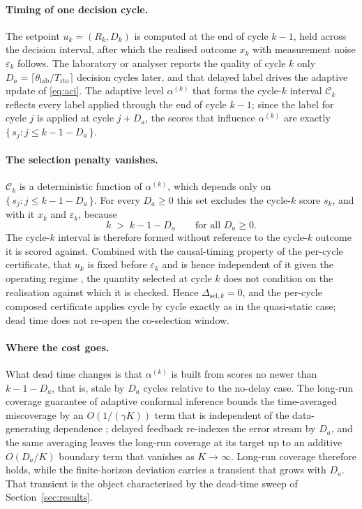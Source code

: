 \documentclass[review,12pt]{elsarticle}
\begin{document}
\paragraph{Timing of one decision cycle.}
The setpoint $u_k=(R_k,D_k)$ is computed at the end of cycle $k-1$, held across the decision
interval, after which the realised outcome $x_k$ with measurement noise $\varepsilon_k$ follows.
The laboratory or analyser reports the quality of cycle $k$ only
$D_a=\lceil \theta_{\mathrm{lab}}/T_{\mathrm{rto}}\rceil$ decision cycles later, and that delayed
label drives the adaptive update of \eqref{eq:aci}. The adaptive level $\alpha^{(k)}$ that forms
the cycle-$k$ interval $\mathcal{C}_k$ reflects every label applied through the end of cycle
$k-1$; since the label for cycle $j$ is applied at cycle $j+D_a$, the scores that influence
$\alpha^{(k)}$ are exactly $\{\, s_j : j \le k-1-D_a \,\}$.

\paragraph{The selection penalty vanishes.}
$\mathcal{C}_k$ is a deterministic function of $\alpha^{(k)}$, which depends only on
$\{\, s_j : j \le k-1-D_a \,\}$. For every $D_a\ge 0$ this set excludes the cycle-$k$ score
$s_k$, and with it $x_k$ and $\varepsilon_k$, because
\begin{equation*}
  k \;>\; k-1-D_a \qquad \text{for all } D_a \ge 0 .
\end{equation*}
The cycle-$k$ interval is therefore formed without reference to the cycle-$k$ outcome it is
scored against. Combined with the causal-timing property of the per-cycle certificate, that
$u_k$ is fixed before $\varepsilon_k$ and is hence independent of it given the operating regime
\citep{busico_m4}, the quantity selected at cycle $k$ does not condition on the realisation
against which it is checked. Hence $\Delta_{\mathrm{sel},k}=0$, and the per-cycle composed
certificate applies cycle by cycle exactly as in the quasi-static case; dead time does not
re-open the co-selection window.

\paragraph{Where the cost goes.}
What dead time changes is that $\alpha^{(k)}$ is built from scores no newer than $k-1-D_a$, that
is, stale by $D_a$ cycles relative to the no-delay case. The long-run coverage guarantee of
adaptive conformal inference bounds the time-averaged miscoverage by an $O(1/(\gamma K))$ term
that is independent of the data-generating dependence \citep{gibbs2021}; delayed feedback
re-indexes the error stream by $D_a$, and the same averaging leaves the long-run coverage at its
target up to an additive $O(D_a/K)$ boundary term that vanishes as $K\to\infty$. Long-run
coverage therefore holds, while the finite-horizon deviation carries a transient that grows with
$D_a$. That transient is the object characterised by the dead-time sweep of
Section~\ref{sec:results}.



\end{document}
